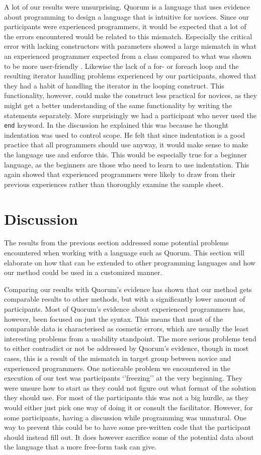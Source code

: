 \documentclass[preprint,10pt]{sigplanconf}
\begin{document}
A lot of our results were unsurprising.
Quorum is a language that uses evidence about programming to design a language that is intuitive for novices.
Since our participants were experienced programmers, it would be expected that a lot of the errors encountered would be related to this mismatch.
Especially the critical error with lacking constructors with parameters showed a large mismatch in what an experienced programmer expected from a class compared to what was shown to be more user-friendly \cite{ParamConstructors}.
Likewise the lack of a for- or foreach loop and the resulting iterator handling problems experienced by our participants, showed that they had a habit of handling the iterator in the looping construct.
This functionality, however, could make the construct less practical for novices, as they might get a better understanding of the same functionality by writing the statements separately.
More surprisingly we had a participant who never used the \lstinline!end! keyword.
In the discussion he explained this was because he thought indentation was used to control scope.
He felt that since indentation is a good practice that all programmers should use anyway, it would make sense to make the language use and enforce this.
This would be especially true for a beginner language, as the beginners are those who need to learn to use indentation.
This again showed that experienced programmers were likely to draw from their previous experiences rather than thoroughly examine the sample sheet.

\section{Discussion}
The results from the previous section addressed some potential problems encountered when working with a language such as Quorum. This section will elaborate on how that can be extended to other programming languages and how our method could be used in a customized manner.

Comparing our results with Quorum's evidence has shown that our method gets comparable results to other methods, but with a significantly lower amount of participants.
Most of Quorum's evidence about experienced programmers has, however, been focused on just the syntax.
This means that most of the comparable data is characterised as cosmetic errors, which are usually the least interesting problems from a usability standpoint.
The more serious problems tend to either contradict or not be addressed by Quorum's evidence, though in most cases, this is a result of the mismatch in target group between novice and experienced programmers.
One noticeable problem we encountered in the execution of our test was participants `'freezing'' at the very beginning.
They were unsure how to start as they could not figure out what format of the solution they should use.
For most of the participants this was not a big hurdle, as they would either just pick one way of doing it or consult the facilitator.
However, for some participants, having a discussion while programming was unnatural.
One way to prevent this could be to have some pre-written code that the participant should instead fill out.
It does however sacrifice some of the potential data about the language that a more free-form task can give.
\end{document}
